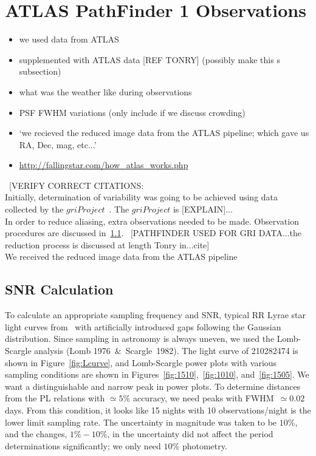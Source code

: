 \documentclass[aps,prb,twocolumn,superscriptaddress]{revtex4-1}
\begin{document}
\section{ATLAS PathFinder 1 Observations}
\begin{itemize}
	\item{} we used data from ATLAS
	\item{} supplemented with ATLAS data [REF TONRY] (possibly make this s subsection)
	\item{} what was the weather like during observations
	\item{} PSF FWHM variations (only include if we discuss crowding)
	\item{} `we recieved the reduced image data from the ATLAS pipeline; which gave us RA, Dec, mag, etc...'
	\item{}\url{http://fallingstar.com/how_atlas_works.php}
\end{itemize}


~[VERIFY CORRECT CITATIONS:\\%
Initially, determination of variability was going to be achieved using data collected by the $gri Project$~\cite{gri}.  The $gri Project$ is [EXPLAIN]...\\
In order to reduce aliasing, extra observations needed to be made.  Observation procedures are discussed in~\cref{sec:data}.
~[PATHFINDER USED FOR GRI DATA...the reduction process is discussed at length Tonry in...cite]\\
We received the reduced image data from the ATLAS pipeline~\cite{PSpipe}~\cite{tonrypipe}


\subsection{SNR Calculation}\label{sec:data}

\noindent To calculate an appropriate sampling frequency and SNR, typical RR Lyrae star light curves from~\cite{RRLyrae}  with artificially introduced gaps following the Gaussian distribution. Since sampling in astronomy is always uneven, we used the Lomb-Scargle analysis (Lomb 1976~$\&$~Scargle~1982). The light curve of 210282474 is shown in Figure~\ref{fig:Lcurve}, and Lomb-Scargle power plots with various sampling conditions are shown in Figures~\ref{fig:1510},~\ref{fig:1010}, and~\ref{fig:1505}. We want a distinguishable and narrow peak in power plots. To determine distances from the PL relations with $\simeq5\%$ accuracy, we need peaks with FWHM~$ \simeq 0.02$ days. From this condition, it looks like 15 nights with 10 observations/night is the lower limit sampling rate. The uncertainty in magnitude was taken to be $10\%$, and the changes, $1\% - 10\%$, in the uncertainty did not affect the period determinations significantly; we only need $10\%$ photometry.
\end{document}
